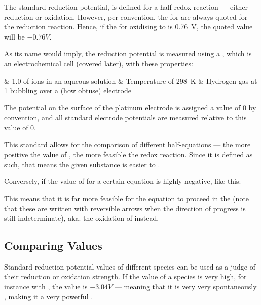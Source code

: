 		The standard reduction potential, \Eo{} is defined for a half redox reaction --- either reduction or oxidation. However, per
		convention, the  for \Eo{} are always quoted for the reduction reaction. Hence, if the \Eo{} for oxidising
		 to  is \SI{+0.76}{\volt}, the quoted \Eo{} value will be $-0.76V$.

		As its name would imply, the  reduction potential is measured using a , which is
		an electrochemical cell (covered later), with these properties:

		\begin{bulletlist}
			& \SI{1.0}{\molarConc} of  ions in an aqueous solution
			& Temperature of \SI{298}{\kelvin}
			& Hydrogen gas at \SI{1}{\atm} bubbling over a  (how obtuse) electrode
		\end{bulletlist}

		The potential on the surface of the platinum electrode is assigned a value of $0$ by convention, and all standard electrode
		potentials are measured relative to this value of $0$.

		This standard allows for the comparison of different half-equations --- the more positive the value of \Eo{}, the more
		feasible the redox reaction. Since it is defined as such, that means the given substance is easier to .

		Conversely, if the value of \Eo{} for a certain equation is highly negative, like this:


		This means that it is far more feasible for the equation to proceed in the  (note that these are
		written with reversible arrows when the direction of progress is still indeterminate), aka. the oxidation of  instead.


		\subsection{Comparing \MEo{} Values}

			Standard reduction potential values of different species can be used as a judge of their reduction or oxidation strength.
			If the \Eo{} value of a species is very high, for instance with , the \Eo{} value is $-3.04V$ --- meaning that it
			is very very spontaneously , making it a very powerful .

